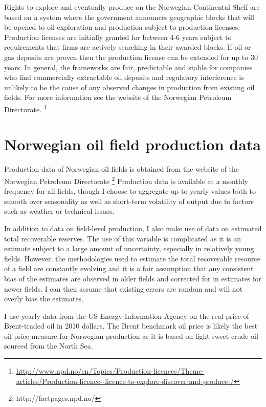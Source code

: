 \documentclass[12pt]{article}
\begin{document}
Rights to explore and eventually produce on the Norwegian Continental Shelf are based on a system where the government announces geographic blocks that will be opened to oil exploration and production subject to production licenses.  Production licenses are initially granted for between 4-6 years subject to requirements that firms are actively searching in their awarded blocks.  If oil or gas deposits are proven then the production license can be extended for up to 30 years.  In general, the frameworks are fair, predictable and stable for companies who find commercially extractable oil deposits and regulatory interference is unlikely to be the cause of any observed changes in production from existing oil fields.  For more information see the website of the Norwegian Petroleum Directorate. \footnote{\url{http://www.npd.no/en/Topics/Production-licences/Theme-articles/Production-licence--licence-to-explore-discover-and-produce-/}}

\section{Norwegian oil field production data}
Production data of Norwegian oil fields is obtained from the website of the Norwegian Petroleum Directorate \footnote{http://factpages.npd.no/}  Production data is available at a monthly frequency for all fields, though I choose to aggregate up to yearly values both to smooth over seasonality as well as short-term volatility of output due to factors such as weather or technical issues.  

In addition to data on field-level production, I also make use of data on estimated total recoverable reserves.  The use of this variable is complicated as it is an estimate subject to a large amount of uncertainty, especially in relatively young fields.  However, the methodologies used to estimate the total recoverable resource of a field are constantly evolving and it is a fair assumption that any consistent bias of the estimates are observed in older fields and corrected for in estimates for newer fields.  I can then assume that existing errors are random and will not overly bias the estimates.  

I use yearly data from the US Energy Information Agency on the real price of Brent-traded oil in 2010 dollars.  The Brent benchmark oil price is likely the best oil price measure for Norwegian production as it is based on light sweet crude oil sourced from the North Sea.  
\end{document}
